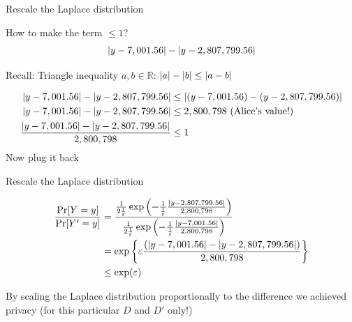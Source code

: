 \documentclass[12pt,aspectratio=169,handout]{beamer}
\begin{document}
\begin{frame}{Rescale the Laplace distribution}

How to make the term $\leq 1$?
$$
\abs{y - 7,001.56} - \abs{y - 2,807,799.56}
$$

\begin{block}{Recall: Triangle inequality}
$a, b \in \mathbb{R}$:
$\abs{a} - \abs{b} \leq \abs{a- b}$
\end{block}
\vspace{-1em}
$$
\begin{aligned}
\abs{y - 7,001.56} - \abs{y - 2,807,799.56} &\leq \abs{(y - 7,001.56) - (y - 2,807,799.56)} \\
\abs{y - 7,001.56} - \abs{y - 2,807,799.56} &\leq 2,800,798 \text{ (Alice's value!)} \\
\frac{
\abs{y - 7,001.56} - \abs{y - 2,807,799.56}
}{2,800,798} &\leq 1 \\
\end{aligned}
$$
Now plug it back

\end{frame}



\begin{frame}{Rescale the Laplace distribution}


$$
\begin{aligned}
\frac{\Pr[Y = y]}{\Pr[Y' = y]} &=
\frac{
\frac{1}{2\frac{1}{\varepsilon}} \exp \left(- \frac{1}{\frac{1}{\varepsilon}}
\frac{
\abs{y - 2,807,799.56}
}{2,800,798}
\right)
}{
\frac{1}{2\frac{1}{\varepsilon}} \exp \left(- \frac{1}{\frac{1}{\varepsilon}}
\frac{
\abs{y - 7,001.56}
}{2,800,798}
\right) 
} \\
&=
\exp \left\{ \varepsilon
\frac{
\left( \abs{y - 7,001.56} - \abs{y - 2,807,799.56} \right)
}{2,800,798}
\right\} \\
& \leq \exp(\varepsilon) \\
\end{aligned}
$$

By scaling the Laplace distribution proportionally to the difference we achieved privacy (for this particular $D$ and $D'$ only!)
\end{frame}
\end{document}
